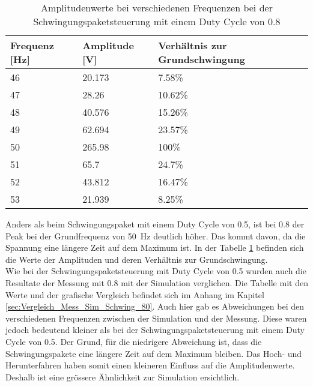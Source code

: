 \begin{table}[ht!]
	\centering
	\begin{tabular}{|l|l|l|}
		\hline
		Frequenz {[}Hz{]} & Amplitude {[}V{]} & Verhältnis zur Grundschwingung \\ \hline
		46                & 20.173            & 7.58\%                         \\ \hline
		47                & 28.26             & 10.62\%                        \\ \hline
		48                & 40.576            & 15.26\%                        \\ \hline
		49                & 62.694            & 23.57\%                        \\ \hline
		50                & 265.98            & 100\%                          \\ \hline
		51                & 65.7              & 24.7\%                         \\ \hline
		52                & 43.812            & 16.47\%                        \\ \hline
		53                & 21.939            & 8.25\%                         \\ \hline
	\end{tabular}
\caption{Amplitudenwerte bei verschiedenen Frequenzen bei der Schwingungspaketsteuerung mit einem Duty Cycle von 0.8}\label{tab:Mess_Spannung_Schwing_80}
\end{table}

Anders als beim Schwingungspaket mit einem Duty Cycle von 0.5, ist bei 0.8 der Peak bei der Grundfrequenz von \SI{50}{Hz} deutlich höher. Das kommt davon, da die Spannung eine längere Zeit auf dem Maximum ist.
In der Tabelle \ref{tab:Mess_Spannung_Schwing_80} befinden sich die Werte der Amplituden und deren Verhältnis zur Grundschwingung.\\
Wie bei der Schwingungspaketsteuerung mit Duty Cycle von 0.5 wurden auch die Resultate der Messung mit 0.8 mit der Simulation verglichen. Die Tabelle mit den Werte und der grafische Vergleich befindet sich im Anhang im Kapitel \ref{sec:Vergleich_Mess_Sim_Schwing_80}. Auch hier gab es Abweichungen bei den verschiedenen Frequenzen zwischen der Simulation und der Messung. Diese waren jedoch bedeutend kleiner als bei der Schwingungspaketsteuerung mit einem Duty Cycle von 0.5. Der Grund, für die niedrigere Abweichung ist, dass die Schwingungspakete eine längere Zeit auf dem Maximum bleiben. Das Hoch- und Herunterfahren haben somit einen kleineren Einfluss auf die Amplitudenwerte. Deshalb ist eine grössere Ähnlichkeit zur Simulation ersichtlich.



